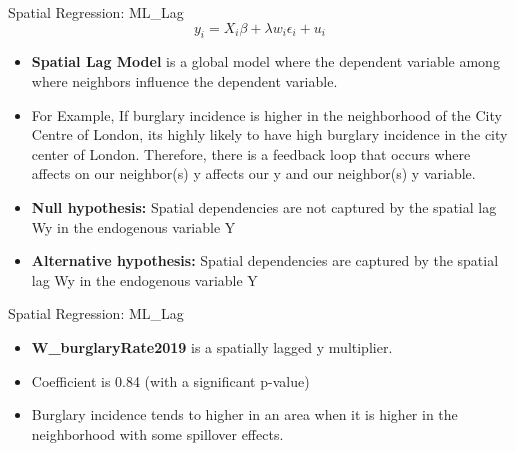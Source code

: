 \documentclass[10pt, aspectratio=169]{beamer}
\begin{document}
\begin{frame}{Spatial Regression: ML\_Lag}
    \begin{equation}
        y_i=X_i \beta+\lambda w_i \epsilon_i+u_i
    \end{equation}
    \begin{itemize}

        \item \textbf{Spatial Lag Model} is a global model where the dependent variable among where neighbors influence the dependent variable.
        \item \textbf{}For Example, If burglary incidence is higher in the neighborhood of the City Centre of London, its highly likely to have high burglary incidence in the city center of London. Therefore, there is a feedback loop that occurs where affects on our neighbor(s) y affects our y and our neighbor(s) y variable.
        \item \textbf{Null hypothesis:} Spatial dependencies are not captured by the spatial lag Wy in the endogenous variable Y
        \item \textbf{Alternative hypothesis:} Spatial dependencies are captured by the spatial lag Wy in the endogenous variable Y

    \end{itemize}
\end{frame}

\begin{frame}{Spatial Regression: ML\_Lag}
    \small\begin{table}[!h]
        
        \caption{\label{tab:ml_lag_summary} Estimation results of ML\_Lag regression.}
    \end{table}
    \begin{itemize}

        \item \textbf{W\_burglaryRate2019} is a spatially lagged y multiplier.
        \item \textbf{} Coefficient is 0.84 (with a significant p-value)
        \item \textbf{} Burglary incidence tends to higher in an area when it is higher in the neighborhood with some spillover effects.

    \end{itemize}
\end{frame}
\end{document}

